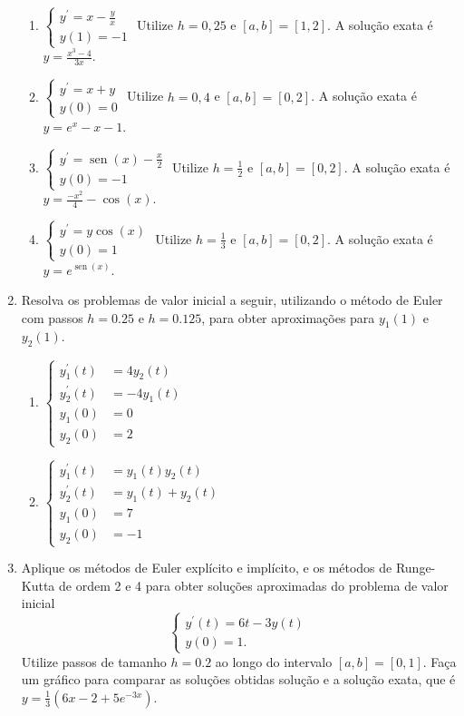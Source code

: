 \documentclass[12pt,a4paper]{article}
\newcommand*\sen{\operatorname{sen}}
\begin{document}
\begin{enumerate}
\begin{enumerate}
\item $\begin{cases}
y^\prime = x-\frac{y}{x} \\
y(1) = -1
\end{cases}$
Utilize $h = 0,25$ e $[a,b] = [1, 2]$. A solução exata é $y = \frac{x^3 - 4}{3x}$.
\item $\begin{cases}
y^\prime = x+y \\
y(0) = 0
\end{cases}$
Utilize $h = 0,4$ e $[a,b] = [0, 2]$. A solução exata é $y = e^x - x - 1$.
\item $\begin{cases}
y^\prime = \sen(x) - \frac{x}{2} \\
y(0) = -1
\end{cases}$
Utilize $h = \frac{1}{2}$ e $[a,b] = [0,2]$. A solução exata é $y = \frac{-x^2}{4} - \cos(x)$.
\item $\begin{cases}
y^\prime = y \cos(x) \\
y(0) = 1
\end{cases}$
Utilize $h = \frac{1}{3}$ e $[a,b] = [0,2]$. A solução exata é $y = e^{\sen(x)}$.
\end{enumerate}

\item Resolva os problemas de valor inicial a seguir, utilizando o método de Euler com passos $h = 0.25$ e $h=0.125$, para obter aproximações para $y_1(1)$ e $y_2(1)$.
\begin{multicols}{2}
\begin{enumerate}
\item $\begin{cases}
y_1^\prime(t) &= 4y_2(t)\\
y_2^\prime(t) &= -4y_1(t)\\
y_1(0) &= 0\\
y_2(0) &= 2
\end{cases}$

\item $\begin{cases}
y_1^\prime(t) &= y_1(t) y_2(t)\\
y_2^\prime(t) &= y_1(t)+y_2(t)\\
y_1(0) &= 7\\
y_2(0) &= -1
\end{cases}$
\end{enumerate}
\end{multicols}

\item Aplique os métodos de Euler explícito e implícito, e os métodos de Runge-Kutta de ordem 2 e 4 para obter soluções aproximadas do problema de valor inicial
\[
\begin{cases}
y^\prime(t) = 6t - 3y(t) \\
y(0) = 1.
\end{cases}\]
Utilize passos de tamanho $h = 0.2$ ao longo do intervalo $[a,b] = [0, 1]$. Faça um gráfico para comparar as soluções obtidas solução e a solução exata, que é $y = \frac{1}{3} (6 x - 2 + 5 e^{-3 x})$.
\end{enumerate}
\end{document}
